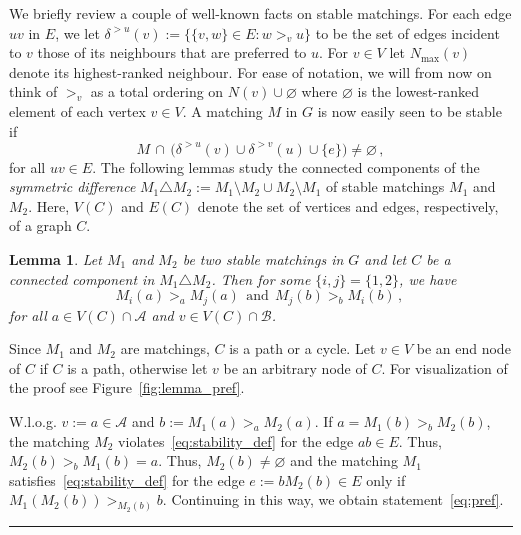 \documentclass[3p,times]{elsarticle}
\newtheorem{lemma}[fact]{Lemma}
\newenvironment{proof}{{\bf Proof:  }}{\hfill\rule{2mm}{2mm}}
\newcommand{\cA}{\mathcal{A}} \newcommand{\cB}{\mathcal{B}}
\begin{document}
We briefly review a couple of well-known facts on stable matchings. 
For each edge $uv$ in $E$, we let
$\delta^{>u}(v):=\{ \{v,w\}\in E: w >_v u \}$ to be the set of edges
incident to $v$ those of its neighbours that are preferred to $u$. 
For $v \in V$ let $N_{\max}(v)$ denote its highest-ranked neighbour. 
For ease of notation, we will from now on think of $>_v$ as a total
ordering on $N(v) \cup \varnothing$ where 
$\varnothing$ is the lowest-ranked element of each vertex $v \in V$. 
A matching $M$ in $G$ is now easily seen to be stable if 
\begin{equation}\label{eq:stability_def}
		M \, \cap \, \big(\delta^{>u}(v) \cup \delta^{>v}(u) \cup  \{e\} \big)\neq\varnothing\,,
\end{equation}
for all $uv \in E$. The following lemmas study the connected components of
the {\em symmetric difference} $M_1\triangle M_2:=M_1\setminus M_2
\cup M_2 \setminus M_1$ of 
stable matchings $M_1$ and $M_2$. Here, $V(C)$ and $E(C)$ denote
the set of vertices and edges, respectively, of a graph $C$.

\begin{lemma}\label{lemma:pref}
Let $M_1$ and $M_2$ be two stable matchings in $G$ and let $C$ be a
connected component in $M_1 \triangle M_2$. Then for some
$\{i,j\}=\{1,2\}$, we have
\begin{equation}\label{eq:pref}
	M_i(a)>_a M_j(a) ~~\text{and} ~~  M_j(b)>_b M_i(b)\,,\,
\end{equation}
for all $a \in V(C) \cap \cA$ and $v \in V(C) \cap \cB$.
\end{lemma}
\begin{proof}
  Since $M_1$ and $M_2$ are matchings, $C$ is a path or a cycle. Let
  $v\in V$ be an end node of $C$ if $C$ is a path, otherwise let $v$
  be an arbitrary node of $C$. For visualization of the proof see Figure~\ref{fig:lemma_pref}.

  W.l.o.g. $v:=a\in \mathcal{A}$ and $b:=M_1(a) >_a M_2(a)$. If
  $a=M_1(b) >_b M_2(b)$, the matching $M_2$
  violates~\eqref{eq:stability_def} for the edge $ab\in E$. Thus,
  $M_2(b) >_b M_1(b)=a$. Thus, $M_2(b)\neq \varnothing$ and the
  matching $M_1$ satisfies~\eqref{eq:stability_def} for the edge
  $e:=bM_2(b)\in E$ only if $M_1(M_2(b))>_{M_2(b)} b$. Continuing
  in this way, we obtain statement~\eqref{eq:pref}.
\end{proof}
\end{document}
